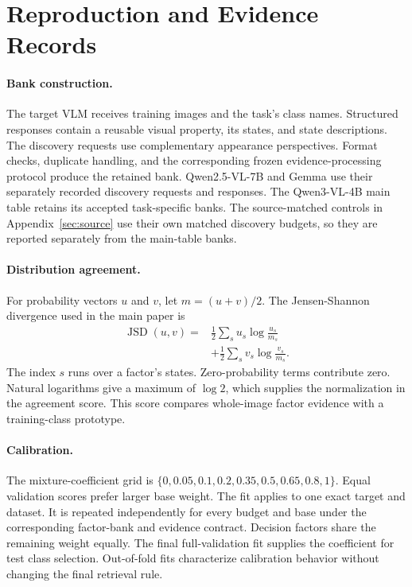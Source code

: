 \documentclass[10pt,twocolumn,letterpaper]{article}
\begin{document}
\section{Reproduction and Evidence Records}
\paragraph{Bank construction.}
The target VLM receives training images and the task's class names. Structured responses contain a reusable visual property, its states, and state descriptions. The discovery requests use complementary appearance perspectives. Format checks, duplicate handling, and the corresponding frozen evidence-processing protocol produce the retained bank. Qwen2.5-VL-7B and Gemma use their separately recorded discovery requests and responses. The Qwen3-VL-4B main table retains its accepted task-specific banks. The source-matched controls in Appendix~\ref{sec:source} use their own matched discovery budgets, so they are reported separately from the main-table banks.

\paragraph{Distribution agreement.}
For probability vectors $u$ and $v$, let $m=(u+v)/2$. The Jensen-Shannon divergence used in the main paper is
\begin{equation}
\begin{split}
\operatorname{JSD}(u,v)={}&\tfrac12\sum_s u_s\log\frac{u_s}{m_s}\\
&+\tfrac12\sum_s v_s\log\frac{v_s}{m_s}.
\end{split}
\end{equation}
The index $s$ runs over a factor's states. Zero-probability terms contribute zero. Natural logarithms give a maximum of $\log 2$, which supplies the normalization in the agreement score. This score compares whole-image factor evidence with a training-class prototype.

\paragraph{Calibration.}
The mixture-coefficient grid is $\{0,0.05,0.1,0.2,0.35,0.5,0.65,0.8,1\}$. Equal validation scores prefer larger base weight. The fit applies to one exact target and dataset. It is repeated independently for every budget and base under the corresponding factor-bank and evidence contract. Decision factors share the remaining weight equally. The final full-validation fit supplies the coefficient for test class selection. Out-of-fold fits characterize calibration behavior without changing the final retrieval rule.
\end{document}
